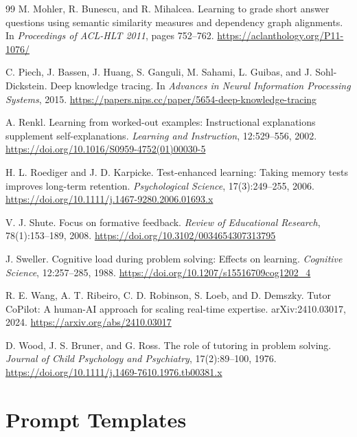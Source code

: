 \documentclass[11pt]{article}
\begin{document}
\begin{thebibliography}{99}
M. Mohler, R. Bunescu, and R. Mihalcea.
\newblock Learning to grade short answer questions using semantic similarity measures and dependency graph alignments.
\newblock In \textit{Proceedings of ACL-HLT 2011}, pages 752--762.
\newblock \url{https://aclanthology.org/P11-1076/}

C. Piech, J. Bassen, J. Huang, S. Ganguli, M. Sahami, L. Guibas, and J. Sohl-Dickstein.
\newblock Deep knowledge tracing.
\newblock In \textit{Advances in Neural Information Processing Systems}, 2015.
\newblock \url{https://papers.nips.cc/paper/5654-deep-knowledge-tracing}

A. Renkl.
\newblock Learning from worked-out examples: Instructional explanations supplement self-explanations.
\newblock \textit{Learning and Instruction}, 12:529--556, 2002.
\newblock \url{https://doi.org/10.1016/S0959-4752(01)00030-5}

H. L. Roediger and J. D. Karpicke.
\newblock Test-enhanced learning: Taking memory tests improves long-term retention.
\newblock \textit{Psychological Science}, 17(3):249--255, 2006.
\newblock \url{https://doi.org/10.1111/j.1467-9280.2006.01693.x}

V. J. Shute.
\newblock Focus on formative feedback.
\newblock \textit{Review of Educational Research}, 78(1):153--189, 2008.
\newblock \url{https://doi.org/10.3102/0034654307313795}

J. Sweller.
\newblock Cognitive load during problem solving: Effects on learning.
\newblock \textit{Cognitive Science}, 12:257--285, 1988.
\newblock \url{https://doi.org/10.1207/s15516709cog1202_4}

R. E. Wang, A. T. Ribeiro, C. D. Robinson, S. Loeb, and D. Demszky.
\newblock Tutor CoPilot: A human-AI approach for scaling real-time expertise.
\newblock arXiv:2410.03017, 2024.
\newblock \url{https://arxiv.org/abs/2410.03017}

D. Wood, J. S. Bruner, and G. Ross.
\newblock The role of tutoring in problem solving.
\newblock \textit{Journal of Child Psychology and Psychiatry}, 17(2):89--100, 1976.
\newblock \url{https://doi.org/10.1111/j.1469-7610.1976.tb00381.x}

\end{thebibliography}

\appendix
\section{Prompt Templates}
\label{appendix:prompts}
\end{document}
